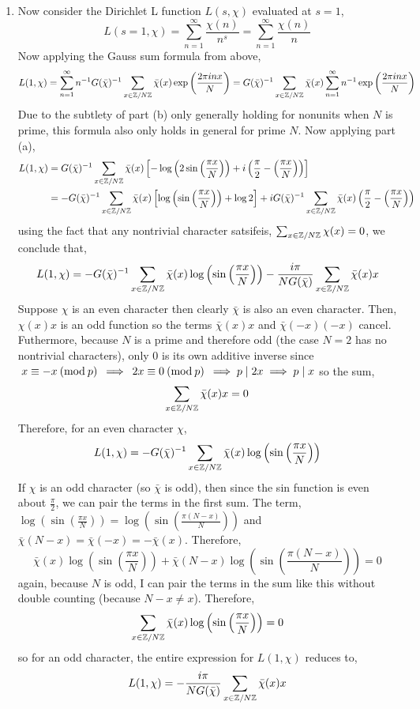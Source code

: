 \documentclass[12pt]{extarticle}
\begin{document}
\begin{enumerate}
\begin{enumerate}
\item Now consider the Dirichlet L function $L(s, \chi)$ evaluated at $s = 1$,
\[L(s = 1, \chi) = \sum_{n = 1}^\infty \frac{\chi(n)}{n^s} = \sum_{n = 1}^\infty \frac{\chi(n)}{n}\]
Now applying the Gauss sum formula from above,
\[L(1, \chi) = \sum_{n = 1}^\infty n^{-1} G(\bar{\chi})^{-1} \sum_{x \in \mathbb{Z} / N \mathbb{Z}} \bar{\chi}(x) \exp{\left(\frac{2\pi i nx}{N}\right)} = G(\bar{\chi})^{-1} \sum_{x \in \mathbb{Z} / N \mathbb{Z}} \bar{\chi}(x) \sum_{n = 1}^\infty n^{-1} \exp{\left(\frac{2\pi i nx}{N}\right)} \]
Due to the subtlety of part (b) only generally holding for nonunits when $N$ is prime, this formula also only holds in general for prime $N$. 
Now applying part (a),
\begin{align*} L(1, \chi) & = G(\bar{\chi})^{-1} \sum_{x \in \mathbb{Z} / N \mathbb{Z}} \bar{\chi}(x) \left[- \log\left(2\sin{\left(\frac{\pi x}{N}\right)}\right) + i\left(\frac{\pi}{2} - \left(\frac{\pi x}{N}\right)\right) \right] \\ & = - G(\bar{\chi})^{-1} \sum_{x \in \mathbb{Z} / N \mathbb{Z}} \bar{\chi}(x) \left[ \log\left(\sin{\left(\frac{\pi x}{N}\right)}\right) + \log{2} \right] + i G(\bar{\chi})^{-1} \sum_{x \in \mathbb{Z} / N \mathbb{Z}} \bar{\chi}(x) \left(\frac{\pi}{2} - \left(\frac{\pi x}{N}\right)\right)
\end{align*}
using the fact that any nontrivial character satsifeis, $\sum_{x \in \mathbb{Z} / N \mathbb{Z}} \chi(x) = 0$, we conclude that,
\[L(1, \chi) = - G(\bar{\chi})^{-1} \sum_{x \in \mathbb{Z} / N \mathbb{Z}} \bar{\chi}(x) \log\left(\sin{\left(\frac{\pi x}{N}\right)}\right) - \frac{i \pi}{N G(\bar{\chi})} \sum_{x \in \mathbb{Z} / N \mathbb{Z}} \bar{\chi}(x) x\]
Suppose $\chi$ is an even character then clearly $\bar{\chi}$ is also an even character. Then, $\chi(x) x$ is an odd function so the terms $\bar{\chi}(x)x$ and $\bar{\chi}(-x)(-x)$ cancel. Futhermore, because $N$ is a prime and therefore odd (the case $N = 2$ has no nontrivial characters), only $0$ is its own additive inverse since $\: x \equiv -x \: (\mathrm{mod} \: p) \: \implies \: 2x \equiv 0 \: (\mathrm{mod} \: p) \: \implies p \mid 2 x \implies p \mid x$ so the sum,
\[ \sum_{x \in \mathbb{Z} / N \mathbb{Z}} \bar{\chi}(x) x = 0 \]
Therefore, for an even character $\chi$,
\[L(1, \chi) = - G(\bar{\chi})^{-1} \sum_{x \in \mathbb{Z} / N \mathbb{Z}} \bar{\chi}(x) \log\left(\sin{\left(\frac{\pi x}{N}\right)}\right)\]
If $\chi$ is an odd character (so $\bar{\chi}$ is odd), then since the sin function is even about $\frac{\pi}{2}$, we can pair the terms in the first sum. The term, $\log\left(\sin{\left(\frac{\pi x}{N}\right)}\right) = \log\left(\sin{\left(\frac{\pi (N - x)}{N}\right)}\right)$ and $\bar{\chi}(N - x) = \bar{\chi}(-x) = - \bar{\chi}(x)$. Therefore,
\[\bar{\chi}(x) \log\left(\sin{\left(\frac{\pi x}{N}\right)}\right) + \bar{\chi}(N - x) \log\left(\sin{\left(\frac{\pi (N - x)}{N}\right)}\right) = 0\]
again, because $N$ is odd, I can pair the terms in the sum like this without double counting (because $N - x \neq x$). Therefore,
\[ \sum_{x \in \mathbb{Z} / N \mathbb{Z}} \bar{\chi}(x) \log\left(\sin{\left(\frac{\pi x}{N}\right)}\right) = 0\]
so for an odd character, the entire expression for $L(1, \chi)$ reduces to,
\[L(1, \chi) = - \frac{i \pi}{N G(\bar{\chi})} \sum_{x \in \mathbb{Z} / N \mathbb{Z}} \bar{\chi}(x) x\]


\end{enumerate}
\end{enumerate}
\end{document}

